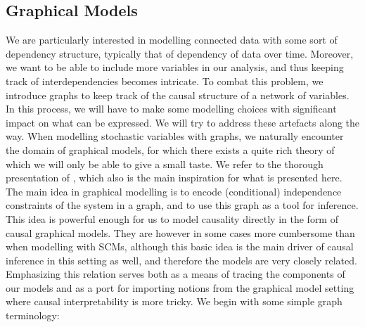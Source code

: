 \documentclass[11pt, a4paper]{memoir}
\theoremstyle{break}
\theoremstyle{break}
\theoremstyle{nonumberplain}
\begin{document}
\subsection{Graphical Models}
We are particularly interested in modelling connected data with some sort of dependency structure, typically that of dependency of data over time. Moreover, we want to be able to include more variables in our analysis, and thus keeping track of interdependencies becomes intricate. To combat this problem, we introduce graphs to keep track of the causal structure of a network of variables. In this process, we will have to make some modelling choices with significant impact on what can be expressed. We will try to address these artefacts along the way. When modelling stochastic variables with graphs, we naturally encounter the domain of graphical models, for which there exists a quite rich theory of which we will only be able to give a small taste. We refer to the thorough presentation of \cite{Steffen}, which also is the main inspiration for what is presented here. The main idea in graphical modelling is to encode (conditional) independence constraints of the system in a graph, and to use this graph as a tool for inference. This idea is powerful enough for us to model causality directly in the form of causal graphical models. They are however in some cases more cumbersome than when modelling with SCMs, although this basic idea is the main driver of causal inference in this setting as well, and therefore the models are very closely related. Emphasizing this relation serves both as a means of tracing the components of our models and as a port for importing notions from the graphical model setting where causal interpretability is more tricky. We begin with some simple graph terminology:
\end{document}
